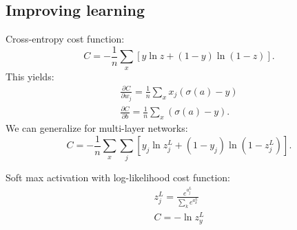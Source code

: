 \documentclass[a4paper,9pt]{extarticle}
\begin{document}
\begin{multicols*}{2}
		\section{Improving learning}
		\begin{riquadro}
			Cross-entropy cost function:
		\begin{equation*}
			C=-\frac{1}{n}\sum_{x}\left[y\ln z+(1-y)\ln(1-z)\right].
		\end{equation*}
		This yields:
		\begin{equation*}
			\begin{array}{c}
				\frac{\partial C}{\partial w_{j}}=\frac{1}{n}\sum_{x}x_{j}(\sigma(a)-y)\\
				\frac{\partial C}{\partial b}=\frac{1}{n}\sum_{x}(\sigma(a)-y).
			\end{array}
		\end{equation*}
		We can generalize for multi-layer networks:
		\begin{equation*}
			C=-\frac{1}{n}\sum_{x}\sum_{j}\left[y_{j}\ln z_{j}^{L}+(1-y_{j})\ln(1-z_{j}^{L})\right].
		\end{equation*}
		\end{riquadro}
		\begin{riquadro}
			Soft max activation with log-likelihood cost function:
			\begin{equation*}
				\begin{array}{c}
					z^{L}_{j}=\frac{e^{a_{j}^{L}}}{\sum_{k}e^{a^{L}_{k}}}\\
					C=-\ln z^{L}_{y}
				\end{array}
			\end{equation*}
		\end{riquadro}

\end{multicols*}
\end{document}
